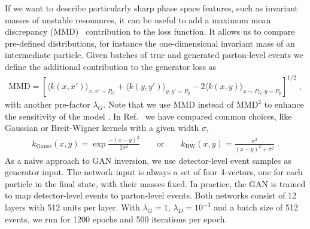 If we want to describe particularly sharp phase space features, such as invariant
masses of unstable resonances, it can be useful to add a 
maximum mean discrepancy (MMD)~\cite{mmd} contribution to the loss function. 
It allows us to compare pre-defined distributions, for instance the 
one-dimensional invariant mass of an intermediate particle. 
Given batches of true and generated parton-level events 
we define the additional contribution to the generator loss as
%
\begin{align}
\text{MMD} =
\left[ \langle k\left(x,x'\right)\rangle_{x,x' \sim P_G}
     + \langle k\left(y,y'\right)\rangle_{y,y' \sim P_p}
     - 2 \langle k\left(x,y \right)\rangle_{x\sim P_G,y \sim P_p} \right]^{1/2} \; ,
\label{eq:MMD}
\end{align}
%
with another pre-factor $\lambda_G$. Note that we use $\text{MMD}$ instead
of $\text{MMD}^2$ to enhance the sensitivity of the model \cite{GMMN}. In
Ref.~\cite{gan_phasespace} we have compared common choices, like
Gaussian or Breit-Wigner kernels with a given width $\sigma$,
%
\begin{align}
k_\text{Gauss} \left(x,y\right) = \exp \frac{- \left(x - y\right)^2}{2 \sigma^2}
\qquad \text{or} \qquad
k_\text{BW}\left(x,y\right) = \frac{\sigma^2}{\left(x - y\right)^2 + \sigma^2} \; .
\label{eq:kernels}
\end{align}
%
As a naive approach to GAN inversion, we use detector-level event
samples as generator input. The network input is always a set of four
4-vectors, one for each particle in the final state, with their masses
fixed.  In practice, the GAN is trained to
map detector-level events to parton-level events.  
Both networks consist of 12 layers with 512 units per layer. With $\lambda_G=1$,
$\lambda_D=10^{-3}$ and a batch size of 512 events, we run for 1200
epochs and 500 iterations per epoch.\medskip

